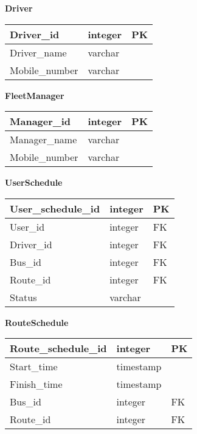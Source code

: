 \newpage
\textbf{Driver}
\begin{table}[H]
	\centering
	\begin{tabular}{| m{4cm} | m{4cm} | m{4cm} |}
		\hline
		Driver\_id & integer & PK\\
		\hline
		Driver\_name & varchar & \\
		\hline
		Mobile\_number & varchar & \\
		\hline
	\end{tabular}
\end{table}
\textbf{FleetManager}
\begin{table}[H]
	\centering
	\begin{tabular}{| m{4cm} | m{4cm} | m{4cm} |}
		\hline
		Manager\_id & integer & PK\\
		\hline
		Manager\_name & varchar & \\
		\hline
		Mobile\_number & varchar & \\
		\hline
	\end{tabular}
\end{table}
\textbf{UserSchedule}
\begin{table}[H]
	\centering
	\begin{tabular}{| m{4cm} | m{4cm} | m{4cm} |}
		\hline
		User\_schedule\_id & integer & PK \\
		\hline
		User\_id & integer & FK \\
		\hline
		Driver\_id & integer & FK\\
		\hline
		Bus\_id & integer & FK \\
		\hline
		Route\_id & integer & FK \\
		\hline
		Status & varchar & \\
		\hline
	\end{tabular}
\end{table}
\textbf{RouteSchedule}
\begin{table}[H]
	\centering
	\begin{tabular}{| m{4cm} | m{4cm} | m{4cm} |}
		\hline
		Route\_schedule\_id & integer & PK \\
		\hline
		Start\_time & timestamp & \\
		\hline
		Finish\_time & timestamp & \\
		\hline
		Bus\_id & integer & FK \\
		\hline
		Route\_id & integer & FK \\
		\hline
	\end{tabular}
\end{table}